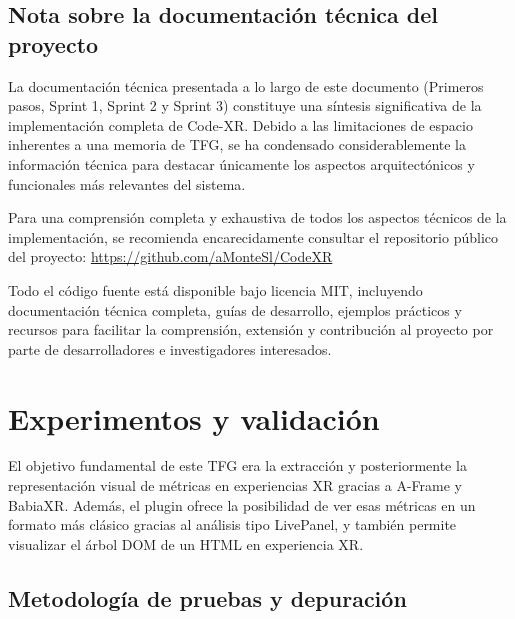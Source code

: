\documentclass[a4paper, 12pt]{book}
\begin{document}
\section{Nota sobre la documentación técnica del proyecto}
\label{sec:nota-documentacion}

La documentación técnica presentada a lo largo de este documento (Primeros pasos, Sprint 1, Sprint 2 y Sprint 3) constituye una síntesis significativa de la implementación completa de Code-XR. Debido a las limitaciones de espacio inherentes a una memoria de TFG, se ha condensado considerablemente la información técnica para destacar únicamente los aspectos arquitectónicos y funcionales más relevantes del sistema.

Para una comprensión completa y exhaustiva de todos los aspectos técnicos de la implementación, se recomienda encarecidamente consultar el repositorio público del proyecto: \url{https://github.com/aMonteSl/CodeXR}~\cite{code-xr}

Todo el código fuente está disponible bajo licencia MIT, incluyendo documentación técnica completa, guías de desarrollo, ejemplos prácticos y recursos para facilitar la comprensión, extensión y contribución al proyecto por parte de desarrolladores e investigadores interesados.



%

\cleardoublepage
\chapter{Experimentos y validación}
\label{chap:experimentos}

El objetivo fundamental de este TFG era la extracción y posteriormente la representación visual de métricas en experiencias XR gracias a A-Frame y BabiaXR. Además, el plugin ofrece la posibilidad de ver esas métricas en un formato más clásico gracias al análisis tipo LivePanel, y también permite visualizar el árbol DOM de un HTML en experiencia XR.

\section{Metodología de pruebas y depuración}
\label{sec:metodologia-pruebas}
\end{document}
